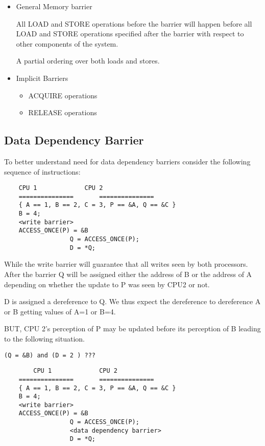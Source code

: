 \documentclass{article}
\begin{document}
\begin{itemize}
  
  
\item General Memory barrier

  All LOAD and STORE operations before the barrier will happen before
  all LOAD and STORE operations specified after the barrier with
  respect to other components of the system.

  A partial ordering over both loads and stores.  

\item Implicit Barriers
  \begin{itemize}
  \item ACQUIRE operations
  \item RELEASE operations
  \end{itemize}
\end{itemize}


\subsection{Data Dependency Barrier}

To better understand need for data dependency barriers consider 
the following sequence of instructions:

\begin{lstlisting}
	CPU 1		      CPU 2
	===============	      ===============
	{ A == 1, B == 2, C = 3, P == &A, Q == &C }
	B = 4;
	<write barrier>
	ACCESS_ONCE(P) = &B
			      Q = ACCESS_ONCE(P);
			      D = *Q;
\end{lstlisting}

While the write barrier will guarantee that all writes seen by both
processors.  After the barrier Q will be assigned either the address
of B or the address of A depending on whether the update to P was seen
by CPU2 or not.

D is assigned a dereference to Q. We thus expect the dereference to
dereference A or B getting values of A=1 or B=4.

BUT, CPU 2's perception of P may be updated before its perception of B
leading to the following situation.

\begin{lstlisting}
(Q = &B) and (D = 2 ) ???
\end{lstlisting}




\begin{lstlisting}
        CPU 1		      CPU 2
	===============	      ===============
	{ A == 1, B == 2, C = 3, P == &A, Q == &C }
	B = 4;
	<write barrier>
	ACCESS_ONCE(P) = &B
			      Q = ACCESS_ONCE(P);
			      <data dependency barrier>
			      D = *Q;  
\end{lstlisting}
\end{document}
